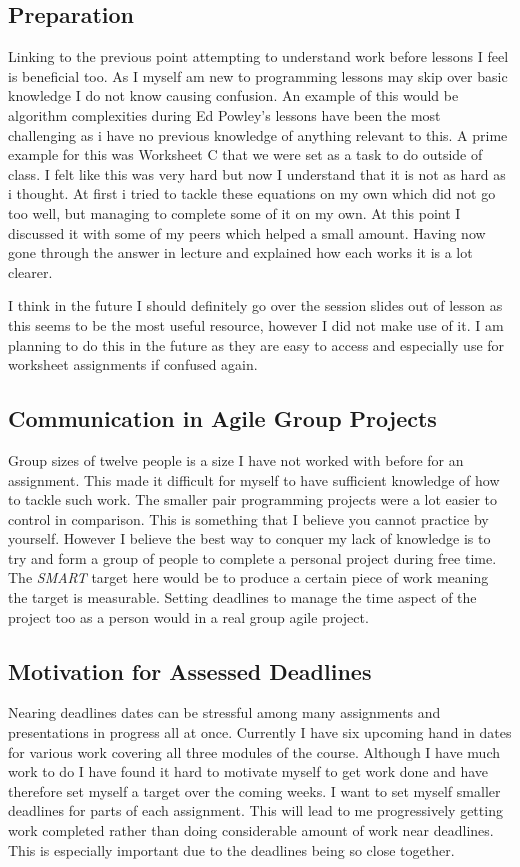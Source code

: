 \documentclass{scrartcl}
\begin{document}
\subsection{Preparation}

Linking to the previous point attempting to understand work before lessons I feel is beneficial too. As I myself am new to programming lessons may skip over basic knowledge I do not know causing confusion. An example of this would be algorithm complexities during Ed Powley's lessons have been the most challenging as i have no previous knowledge of anything relevant to this. A prime example for this was Worksheet C that we were set as a task to do outside of class. I felt like this was very hard but now I understand that it is not as hard as i thought. At first i tried to tackle these equations on my own which did not go too well, but managing to complete some of it on my own. At this point I discussed it with some of my peers which helped a small amount. Having now gone through the answer in lecture and explained how each works it is a lot clearer. 

I think in the future I should definitely go over the session slides out of lesson as this seems to be the most useful resource, however I did not make use of it. I am planning to do this in the future as they are easy to access and especially use for worksheet assignments if confused again.

\subsection{Communication in Agile Group Projects}
Group sizes of twelve people is a size I have not worked with before for an assignment. This made it difficult for myself to have sufficient knowledge of how to tackle such work. The smaller pair programming projects were a lot easier to control in comparison. This is something that I believe you cannot practice by yourself. However I believe the best way to conquer my lack of knowledge is to try and form a group of people to complete a personal project during free time. The \textit{SMART} target here would be to produce a certain piece of work meaning the target is measurable. Setting deadlines to manage the time aspect of the project too as a person would in a real group agile project. 

\subsection{Motivation for Assessed Deadlines}
Nearing deadlines dates can be stressful among many assignments and presentations in progress all at once. Currently I have six upcoming hand in dates for various work covering all three modules of the course. Although I have much work to do I have found it hard to motivate myself to get work done and have therefore set myself a target over the coming weeks. I want to set myself smaller deadlines for parts of each assignment. This will lead to me progressively getting work completed rather than doing considerable amount of work near deadlines. This is especially important due to the deadlines being so close together.
\end{document}
